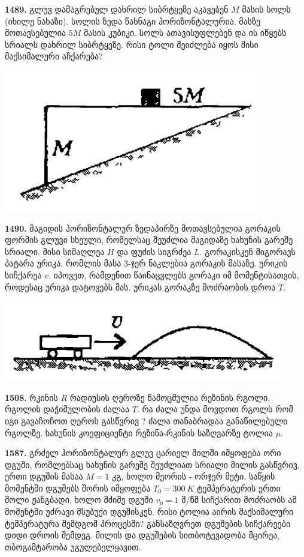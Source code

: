 \documentclass[12pt,a4paper,]{report}
\begin{document}
\textbf{1489.} გლუვ დამაგრებულ დახრილ სიბრტყეზე აკავებენ $M$ მასის სოლს (იხილე ნახაზი). სოლის ზედა წახნაგი ჰორიზონტალურია. მასზე მოთავსებულია $5M$ მასის კუბიკი. სოლს ათავისუფლებენ და ის იწყებს სრიალს დახრილ სიბრტყეზე. რისი ტოლი შეიძლება იყოს მისი მაქსიმალური აჩქარება?
		\begin{center}
			\includegraphics[scale=0.4]{images/F1489.png}
		\end{center}

\textbf{1490.} მაგიდის ჰორიზონტალურ ზედაპირზე მოთავსებულია გორაკის ფორმის გლუვი სხეული, რომელსაც შეუძლია მაგიდაზე ხახუნის გარეშე სრიალი. მისი სიმაღლეა $H$ და ფუძის სიგრძეა $L$. გორაკისკენ მიგორავს პატარა ურიკა, რომლის მასა 3-ჯერ ნაკლებია გორაკის მასაზე. ურიკის სიჩქარეა $v$. იპოვეთ, რამდენით წაინაცვლებს გორაკი  იმ მომენტისათვის, როდესაც ურიკა დატოვებს მას. ურიკას გორაკზე მოძრაობის დროა $T$. 
		\begin{center}
			\includegraphics[scale=0.4]{images/F1490.png}
		\end{center}
	
\textbf{1508.} რკინის $R$ რადიუსის ღეროზე წამოცმულია რეზინის რგოლი. რგოლის დაჭიმულობის ძალაა $T$. რა ძალა უნდა მოვდოთ რგოლს რომ იგი გავაჩოჩოთ ღეროს გასწვრივ ? ძალა თანაბრადაა განაწილებული რგოლზე. ხახუნის კოეფიციენტი რეზინა-რკინის საზღვარზე ტოლია $\mu$. 

\textbf{1587.} გრძელ ჰორიზონტალურ გლუვ ცარიელ მილში იმყოფება ორი დგუში, რომლებსაც ხახუნის გარეშე შეუძლიათ სრიალი მილის გასწვრივ. ერთი დგუშის მასაა $M=1$ კგ, ხოლო მეორის - ორჯერ მეტი. საწყის მომენტში დგუშებს შორის იმყოფება $T_0=300~K$ ტემპერატურის ერთი მოლი ჟანგბადი, ხოლო მძიმე დგუში $v_0=1$ მ/წმ სიჩქარით მოძრაობს ამ მომენტში უძრავი მსუბუქი დგუშისკენ. რისი ტოლია აირის მაქსიმალური ტემპერატურა შემდგომ პროცესში? განსაზღვრეთ დგუშების სიჩქარეები დიდი დროის შემდეგ. მილის და დგუშების სითბოტევადობა მცირეა, თბოგამტარობა უგულებელყავით.
\end{document}

